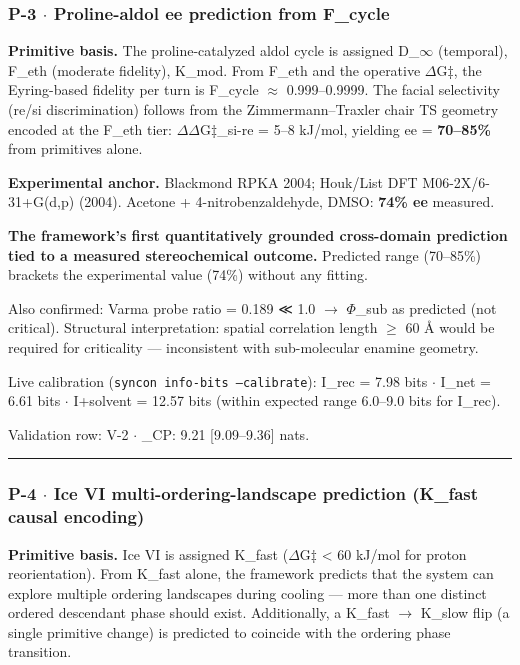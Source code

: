 \documentclass[12pt,a4paper]{article}
\begin{document}
\subsubsection{P-3 $\cdot$ Proline-aldol ee prediction from F\_cycle}

\textbf{Primitive basis.} The proline-catalyzed aldol cycle is assigned D\_$\infty$ (temporal), F\_eth (moderate fidelity), K\_mod. From F\_eth and the operative $\Delta$G‡, the Eyring-based fidelity per turn is F\_cycle $\approx$ 0.999--0.9999. The facial selectivity (re/si discrimination) follows from the Zimmermann--Traxler chair TS geometry encoded at the F\_eth tier: $\Delta$$\Delta$G‡\_si-re = 5--8 kJ/mol, yielding ee = \textbf{70--85\%} from primitives alone.

\textbf{Experimental anchor.} Blackmond RPKA 2004; Houk/List DFT M06-2X/6-31+G(d,p) (2004). Acetone + 4-nitrobenzaldehyde, DMSO: \textbf{74\% ee} measured.

\textbf{The framework's first quantitatively grounded cross-domain prediction tied to a measured stereochemical outcome.} Predicted range (70--85\%) brackets the experimental value (74\%) without any fitting.

Also confirmed: Varma probe ratio = 0.189 ≪ 1.0 $\rightarrow$ $\Phi$\_sub as predicted (not critical). Structural interpretation: spatial correlation length $\geq$ 60 Å would be required for criticality --- inconsistent with sub-molecular enamine geometry.

Live calibration (\texttt{syncon info-bits --calibrate}): I\_rec = 7.98 bits $\cdot$ I\_net = 6.61 bits $\cdot$ I+solvent = 12.57 bits (within expected range 6.0--9.0 bits for I\_rec). 

Validation row: V-2 $\cdot$ \xi\_CP: 9.21 {[}9.09--9.36{]} nats.

\begin{center}
\rule{0.5\textwidth}{0.4pt}
\end{center}

\subsubsection{P-4 $\cdot$ Ice VI multi-ordering-landscape prediction (K\_fast causal encoding)}

\textbf{Primitive basis.} Ice VI is assigned K\_fast ($\Delta$G‡ \textless{} 60 kJ/mol for proton reorientation). From K\_fast alone, the framework predicts that the system can explore multiple ordering landscapes during cooling --- more than one distinct ordered descendant phase should exist. Additionally, a K\_fast $\rightarrow$ K\_slow flip (a single primitive change) is predicted to coincide with the ordering phase transition.
\end{document}
